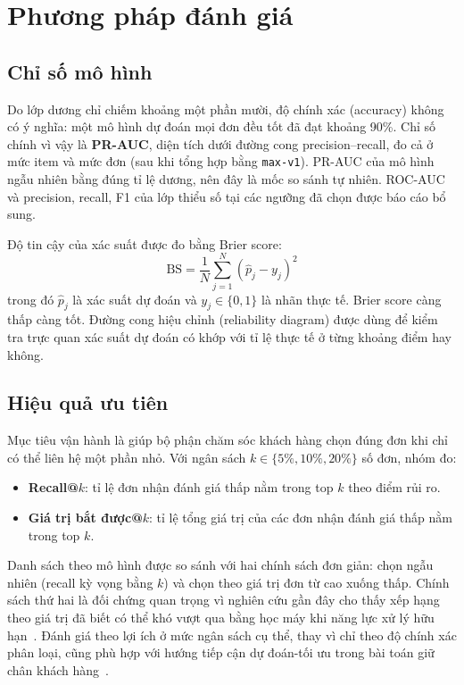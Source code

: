 
\section{Phương pháp đánh giá}\label{sec:eval}

\subsection{Chỉ số mô hình}

Do lớp dương chỉ chiếm khoảng một phần mười, độ chính xác (accuracy) không có ý nghĩa: một mô hình dự đoán mọi đơn đều tốt đã đạt khoảng 90\%. Chỉ số chính vì vậy là \textbf{PR-AUC}, diện tích dưới đường cong precision--recall, đo cả ở mức item và mức đơn (sau khi tổng hợp bằng \texttt{max-v1}). PR-AUC của mô hình ngẫu nhiên bằng đúng tỉ lệ dương, nên đây là mốc so sánh tự nhiên. ROC-AUC và precision, recall, F1 của lớp thiểu số tại các ngưỡng đã chọn được báo cáo bổ sung.

Độ tin cậy của xác suất được đo bằng Brier score:
\begin{equation}\label{eq:brier}
  \mathrm{BS} = \frac{1}{N}\sum_{j=1}^{N}\left(\hat{p}_j - y_j\right)^2
\end{equation}
trong đó $\hat p_j$ là xác suất dự đoán và $y_j \in \{0,1\}$ là nhãn thực tế. Brier score càng thấp càng tốt. Đường cong hiệu chỉnh (reliability diagram) được dùng để kiểm tra trực quan xác suất dự đoán có khớp với tỉ lệ thực tế ở từng khoảng điểm hay không.

\subsection{Hiệu quả ưu tiên}

Mục tiêu vận hành là giúp bộ phận chăm sóc khách hàng chọn đúng đơn khi chỉ có thể liên hệ một phần nhỏ. Với ngân sách $k \in \{5\%, 10\%, 20\%\}$ số đơn, nhóm đo:
\begin{itemize}
  \item \textbf{Recall@$k$}: tỉ lệ đơn nhận đánh giá thấp nằm trong top $k$ theo điểm rủi ro.
  \item \textbf{Giá trị bắt được@$k$}: tỉ lệ tổng giá trị của các đơn nhận đánh giá thấp nằm trong top $k$.
\end{itemize}
Danh sách theo mô hình được so sánh với hai chính sách đơn giản: chọn ngẫu nhiên (recall kỳ vọng bằng $k$) và chọn theo giá trị đơn từ cao xuống thấp. Chính sách thứ hai là đối chứng quan trọng vì nghiên cứu gần đây cho thấy xếp hạng theo giá trị đã biết có thể khó vượt qua bằng học máy khi năng lực xử lý hữu hạn~\cite{li2026valuesorting}. Đánh giá theo lợi ích ở mức ngân sách cụ thể, thay vì chỉ theo độ chính xác phân loại, cũng phù hợp với hướng tiếp cận dự đoán-tối ưu trong bài toán giữ chân khách hàng~\cite{gomezvargas2025}.

